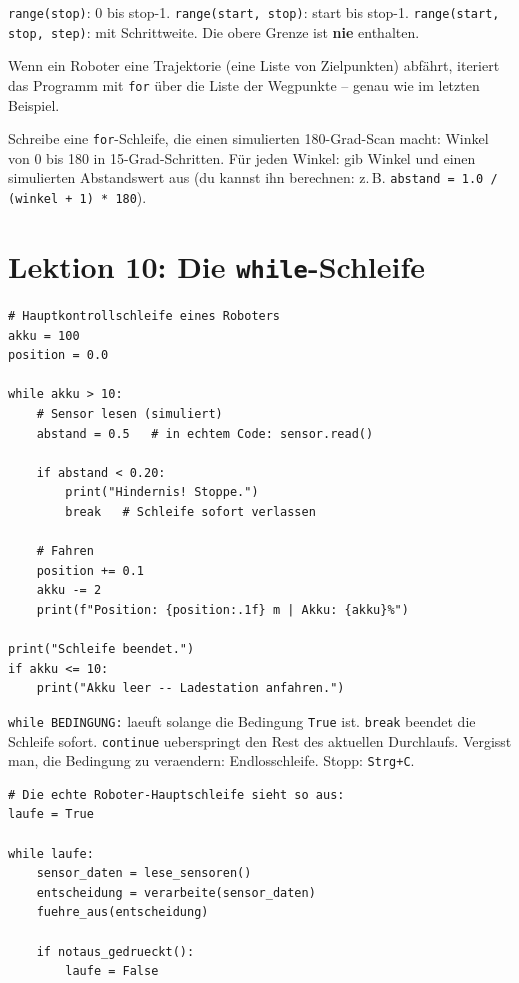 \begin{merksatz}
\texttt{range(stop)}: 0 bis stop-1. \texttt{range(start, stop)}: start bis stop-1. \texttt{range(start, stop, step)}: mit Schrittweite. Die obere Grenze ist \textbf{nie} enthalten.
\end{merksatz}

\begin{praxis}
Wenn ein Roboter eine Trajektorie (eine Liste von Zielpunkten) abfährt, iteriert das Programm mit \texttt{for} über die Liste der Wegpunkte -- genau wie im letzten Beispiel.
\end{praxis}

\begin{uebung}[title=Übung 3.1: Sensor-Scan]
Schreibe eine \texttt{for}-Schleife, die einen simulierten 180-Grad-Scan macht: Winkel von 0 bis 180 in 15-Grad-Schritten. Für jeden Winkel: gib Winkel und einen simulierten Abstandswert aus (du kannst ihn berechnen: z.\,B. \texttt{abstand = 1.0 / (winkel + 1) * 180}).
\end{uebung}

\section{Lektion 10: Die \texttt{while}-Schleife}

\begin{lstlisting}
# Hauptkontrollschleife eines Roboters
akku = 100
position = 0.0

while akku > 10:
    # Sensor lesen (simuliert)
    abstand = 0.5   # in echtem Code: sensor.read()

    if abstand < 0.20:
        print("Hindernis! Stoppe.")
        break   # Schleife sofort verlassen

    # Fahren
    position += 0.1
    akku -= 2
    print(f"Position: {position:.1f} m | Akku: {akku}%")

print("Schleife beendet.")
if akku <= 10:
    print("Akku leer -- Ladestation anfahren.")
\end{lstlisting}

\begin{merksatz}
\texttt{while BEDINGUNG:} laeuft solange die Bedingung \texttt{True} ist. \texttt{break} beendet die Schleife sofort. \texttt{continue} ueberspringt den Rest des aktuellen Durchlaufs. Vergisst man, die Bedingung zu veraendern: Endlosschleife. Stopp: \texttt{Strg+C}.
\end{merksatz}

\begin{lstlisting}
# Die echte Roboter-Hauptschleife sieht so aus:
laufe = True

while laufe:
    sensor_daten = lese_sensoren()
    entscheidung = verarbeite(sensor_daten)
    fuehre_aus(entscheidung)

    if notaus_gedrueckt():
        laufe = False
\end{lstlisting}

